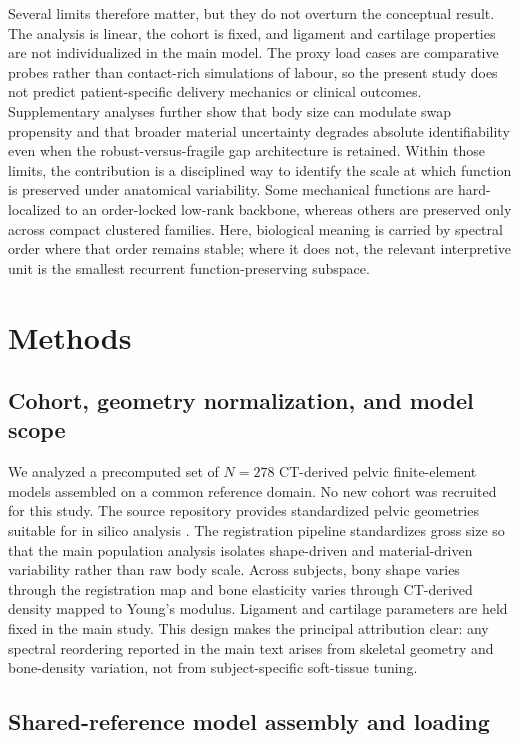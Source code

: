 \documentclass[11pt]{article}
\begin{document}
Several limits therefore matter, but they do not overturn the conceptual result.
The analysis is linear, the cohort is fixed, and ligament and cartilage properties are not individualized in the main model.
The proxy load cases are comparative probes rather than contact-rich simulations of labour, so the present study does not predict patient-specific delivery mechanics or clinical outcomes.
Supplementary analyses further show that body size can modulate swap propensity and that broader material uncertainty degrades absolute identifiability even when the robust-versus-fragile gap architecture is retained.
Within those limits, the contribution is a disciplined way to identify the scale at which function is preserved under anatomical variability.
Some mechanical functions are hard-localized to an order-locked low-rank backbone, whereas others are preserved only across compact clustered families.
Here, biological meaning is carried by spectral order where that order remains stable; where it does not, the relevant interpretive unit is the smallest recurrent function-preserving subspace.

\section{Methods}
\label{sec:methods}

\subsection{Cohort, geometry normalization, and model scope}

We analyzed a precomputed set of $N{=}278$ CT-derived pelvic finite-element models assembled on a common reference domain.
No new cohort was recruited for this study.
The source repository provides standardized pelvic geometries suitable for in silico analysis \citep{HenyssKuchar2025BoneDat}.
The registration pipeline standardizes gross size so that the main population analysis isolates shape-driven and material-driven variability rather than raw body scale.
Across subjects, bony shape varies through the registration map and bone elasticity varies through CT-derived density mapped to Young's modulus.
Ligament and cartilage parameters are held fixed in the main study.
This design makes the principal attribution clear: any spectral reordering reported in the main text arises from skeletal geometry and bone-density variation, not from subject-specific soft-tissue tuning.

\subsection{Shared-reference model assembly and loading}
\end{document}
